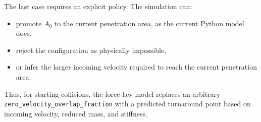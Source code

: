 The last case requires an explicit policy.  The simulation can:

\begin{itemize}[leftmargin=*]
    \item promote $A_0$ to the current penetration area, as the current Python
    model does,
    \item reject the configuration as physically impossible,
    \item or infer the larger incoming velocity required to reach the current
    penetration area.
\end{itemize}

Thus, for starting collisions, the force-law model replaces an arbitrary
\texttt{zero\_velocity\_overlap\_fraction} with a predicted turnaround point
based on incoming velocity, reduced mass, and stiffness.